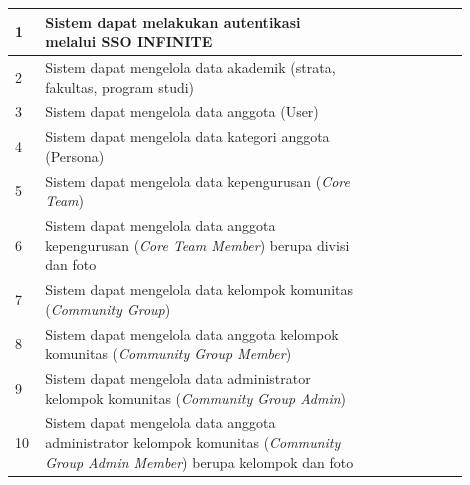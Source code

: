 \begin{longtable}{|p{0.05\linewidth}|p{0.65\linewidth}|p{0.1\linewidth}|p{0.1\linewidth}|}
      1           & Sistem dapat melakukan autentikasi melalui SSO INFINITE                                                                               &                                         &                \\
      \hline
      2           & Sistem dapat mengelola data akademik (strata, fakultas, program studi)                                                                &                                         &                \\
      \hline
      3           & Sistem dapat mengelola data anggota (User)                                                                                            &                                         &                \\
      \hline
      4           & Sistem dapat mengelola data kategori anggota (Persona)                                                                                &                                         &                \\
      \hline
      5           & Sistem dapat mengelola data kepengurusan (\textit{Core Team})                                                                         &                                         &                \\
      \hline
      6           & Sistem dapat mengelola data anggota kepengurusan (\textit{Core Team Member}) berupa divisi dan foto                                   &                                         &                \\
      \hline
      7           & Sistem dapat mengelola data kelompok komunitas (\textit{Community Group})                                                             &                                         &                \\
      \hline
      8           & Sistem dapat mengelola data anggota kelompok komunitas (\textit{Community Group Member})                                              &                                         &                \\
      \hline
      9           & Sistem dapat mengelola data administrator kelompok komunitas (\textit{Community Group Admin})                                         &                                         &                \\
      \hline
      10          & Sistem dapat mengelola data anggota administrator kelompok komunitas (\textit{Community Group Admin Member}) berupa kelompok dan foto &                                         &                \\

\end{longtable}
